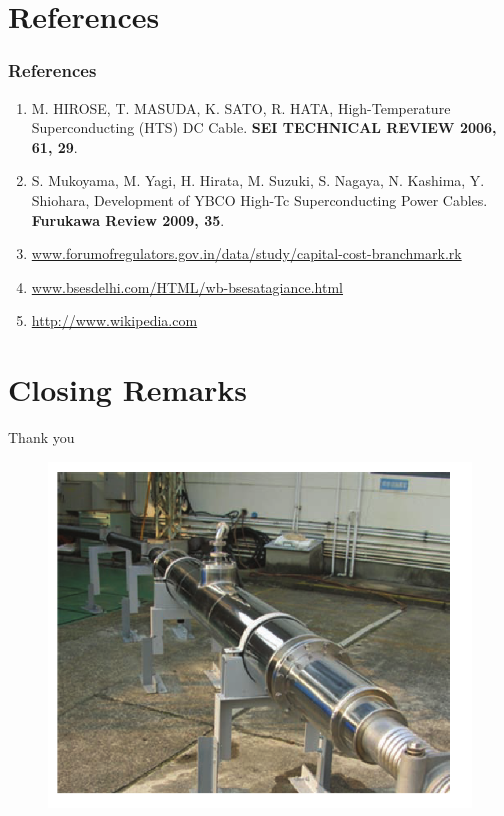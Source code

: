 \documentclass{beamer}
\begin{document}
\section{References}
	\begin{frame}
	\frametitle{References}
		\begin{enumerate}
		\item M. HIROSE, T. MASUDA, K. SATO, R. HATA, High-Temperature Superconducting
		(HTS) DC Cable. \textbf{SEI TECHNICAL REVIEW 2006, 61, 29}. 
		\item S. Mukoyama, M. Yagi, H. Hirata, M. Suzuki, S. Nagaya, N.
		Kashima, Y. Shiohara, Development of YBCO High-Tc Superconducting
		Power Cables. \textbf{Furukawa Review 2009, 35}. 
		\item \href{http://www.forumofregulators.gov.in/data/study/capital-cost-branchmark.rk}{www.forumofregulators.gov.in/data/study/capital-cost-branchmark.rk}
		\item \href{http://www.bsesdelhi.com/HTML/wb-bsesatagiance.html }{www.bsesdelhi.com/HTML/wb-bsesatagiance.html }
		\item \href{http://www.wikipedia.com}{http://www.wikipedia.com}
		\end{enumerate}
	\end{frame}

\section{Closing Remarks}
	\begin{frame}
	\Huge{\centerline{Thank you}}
	\begin{figure}
		\includegraphics[width=0.8\linewidth]{normal}
	\end{figure}
	\end{frame}

\end{document}
